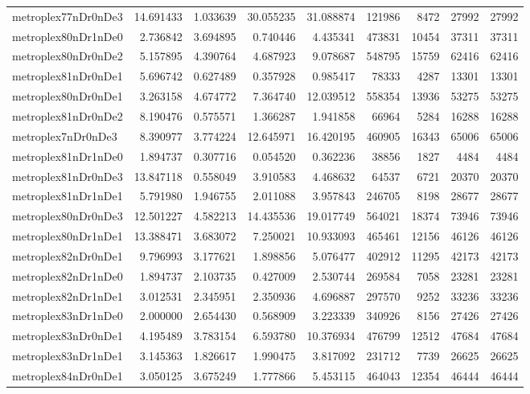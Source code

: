 \begin{longtable}{|l|r|r|r|r|r|r|r|r|}
metroplex77nDr0nDe3 & 14.691433 & 1.033639 & 30.055235 & 31.088874 & 121986 & 8472 & 27992 & 27992 \\
metroplex80nDr1nDe0 & 2.736842 & 3.694895 & 0.740446 & 4.435341 & 473831 & 10454 & 37311 & 37311 \\
metroplex80nDr0nDe2 & 5.157895 & 4.390764 & 4.687923 & 9.078687 & 548795 & 15759 & 62416 & 62416 \\
metroplex81nDr0nDe1 & 5.696742 & 0.627489 & 0.357928 & 0.985417 & 78333 & 4287 & 13301 & 13301 \\
metroplex80nDr0nDe1 & 3.263158 & 4.674772 & 7.364740 & 12.039512 & 558354 & 13936 & 53275 & 53275 \\
metroplex81nDr0nDe2 & 8.190476 & 0.575571 & 1.366287 & 1.941858 & 66964 & 5284 & 16288 & 16288 \\
metroplex7nDr0nDe3 & 8.390977 & 3.774224 & 12.645971 & 16.420195 & 460905 & 16343 & 65006 & 65006 \\
metroplex81nDr1nDe0 & 1.894737 & 0.307716 & 0.054520 & 0.362236 & 38856 & 1827 & 4484 & 4484 \\
metroplex81nDr0nDe3 & 13.847118 & 0.558049 & 3.910583 & 4.468632 & 64537 & 6721 & 20370 & 20370 \\
metroplex81nDr1nDe1 & 5.791980 & 1.946755 & 2.011088 & 3.957843 & 246705 & 8198 & 28677 & 28677 \\
metroplex80nDr0nDe3 & 12.501227 & 4.582213 & 14.435536 & 19.017749 & 564021 & 18374 & 73946 & 73946 \\
metroplex80nDr1nDe1 & 13.388471 & 3.683072 & 7.250021 & 10.933093 & 465461 & 12156 & 46126 & 46126 \\
metroplex82nDr0nDe1 & 9.796993 & 3.177621 & 1.898856 & 5.076477 & 402912 & 11295 & 42173 & 42173 \\
metroplex82nDr1nDe0 & 1.894737 & 2.103735 & 0.427009 & 2.530744 & 269584 & 7058 & 23281 & 23281 \\
metroplex82nDr1nDe1 & 3.012531 & 2.345951 & 2.350936 & 4.696887 & 297570 & 9252 & 33236 & 33236 \\
metroplex83nDr1nDe0 & 2.000000 & 2.654430 & 0.568909 & 3.223339 & 340926 & 8156 & 27426 & 27426 \\
metroplex83nDr0nDe1 & 4.195489 & 3.783154 & 6.593780 & 10.376934 & 476799 & 12512 & 47684 & 47684 \\
metroplex83nDr1nDe1 & 3.145363 & 1.826617 & 1.990475 & 3.817092 & 231712 & 7739 & 26625 & 26625 \\
metroplex84nDr0nDe1 & 3.050125 & 3.675249 & 1.777866 & 5.453115 & 464043 & 12354 & 46444 & 46444 \\

\end{longtable}
